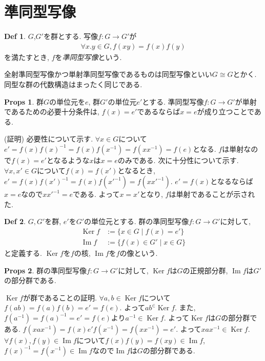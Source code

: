 \documentclass[dvipdfmx]{jsarticle}
\theoremstyle{definition}
\newtheorem{props}{Props}
\newtheorem{definition}{Def}
\numberwithin{equation}{section}
\numberwithin{props}{section}
\numberwithin{definition}{section}
\numberwithin{note}{section}
\DeclareMathOperator{\Ker}{Ker}
\DeclareMathOperator{\Image}{Im}
\begin{document}
\section{準同型写像}
\begin{definition}
     $G$,$G'$を群とする. 写像$f\colon G\to G'$が
     \begin{align}
          \forall x.y\in G, f(xy)=f(x)f(y)
     \end{align} 
     を満たすとき, $f$を\emph{準同型写像}という.
\end{definition}
全射準同型写像かつ単射準同型写像であるものは同型写像といい$G\cong G$とかく. 同型な群の代数構造はまったく同じである.
\begin{props}
     群$G$の単位元を$e$, 群$G'$の単位元$e'$とする. 準同型写像$f\colon G\to G'$が単射であるための必要十分条件は, $f(x)=e'$であるならば$x=e$が成り立つことである. 
\end{props}
(証明) 必要性について示す. $\forall x\in G$について$e'=f(x)f(x)^{-1}=f(x)f(x^{-1})=f(xx^{-1})=f(e)$となる. $f$は単射なので$f(x)=e'$となるような$x$は$x=e$のみである. 次に十分性について示す.
$\forall x,x'\in G$について$f(x)=f(x')$となるとき, $e'=f(x)f(x')^{-1}=f(x)f(x'^{-1})=f(xx'^{-1})$. $e'=f(x)$となるならば$x=e$なので$xx'^{-1}=e$である. よって$x=x'$となり, $f$は単射であることが示された.

\begin{definition}
     $G,G'$を群, $e'$を$G'$の単位元とする. 群の準同型写像$f\colon G\to G'$に対して,
     \begin{align}
          \Ker f&:=\lbrace x\in G\mid f(x)=e'\rbrace\\
          \Image f&:=\lbrace f(x)\in G'\mid x\in G\rbrace
     \end{align}
     と定義する. $\Ker f$を$f$の核, $\Image f$を$f$の像という.
\end{definition}
\begin{props}
     群の準同型写像$f\colon G\to G'$に対して, $\Ker f$は$G$の正規部分群, $\Image f$は$G'$の部分群である.
\end{props}
$\Ker f$が群であることの証明. $\forall a,b\in \Ker f$について$f(ab)=f(a)f(b)=e'=f(e)$. よって$ab^\in \Ker f$. また, $f(a^{-1})=f(a)^{-1}=e'=f(e)$より$a^{-1}\in \Ker f$. よって$\Ker f$は$G$の部分群である. $f(xax^{-1})=f(x)e'f(x^{-1})=f(xx^{-1})=e'$. よって$xax^{-1}\in \Ker f$. 
$\forall f(x),f(y)\in \Image f$について$f(x)f(y)=f(xy)\in \Image f$,$f(x)^{-1}=f(x^{-1})\in \Image f$なので$\Image f$は$G$の部分群である.
\end{document}
